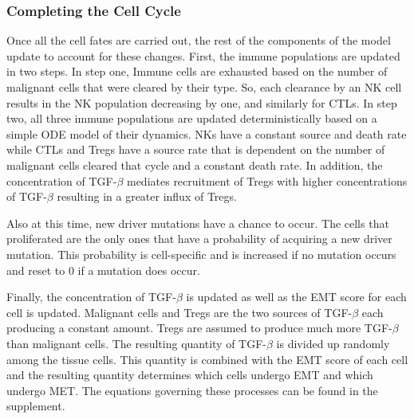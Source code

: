 \documentclass[11pt]{article}
\begin{document}



\subsubsection{Completing the Cell Cycle}
Once all the cell fates are carried out, the rest of the components of the model update to account for these changes.
First, the immune populations are updated in two steps.
In step one, Immune cells are exhausted based on the number of malignant cells that were cleared by their type.
So, each clearance by an NK cell results in the NK population decreasing by one, and similarly for CTLs.
In step two, all three immune populations are updated deterministically based on a simple ODE model of their dynamics.
NKs have a constant source and death rate while CTLs and Tregs have a source rate that is dependent on the number of malignant cells cleared that cycle and a constant death rate.
In addition, the concentration of TGF-$\beta$ mediates recruitment of Tregs with higher concentrations of TGF-$\beta$ resulting in a greater influx of Tregs.
\par
Also at this time, new driver mutations have a chance to occur.
The cells that proliferated are the only ones that have a probability of acquiring a new driver mutation.
This probability is cell-specific and is increased if no mutation occurs and reset to 0 if a mutation does occur.
\par
Finally, the concentration of TGF-$\beta$ is updated as well as the EMT score for each cell is updated.
Malignant cells and Tregs are the two sources of TGF-$\beta$ each producing a constant amount.
Tregs are assumed to produce much more TGF-$\beta$ than malignant cells.
The resulting quantity of TGF-$\beta$ is divided up randomly among the tissue cells.
This quantity is combined with the EMT score of each cell and the resulting quantity determines which cells undergo EMT and which undergo MET.
The equations governing these processes can be found in the supplement.


\end{document}
